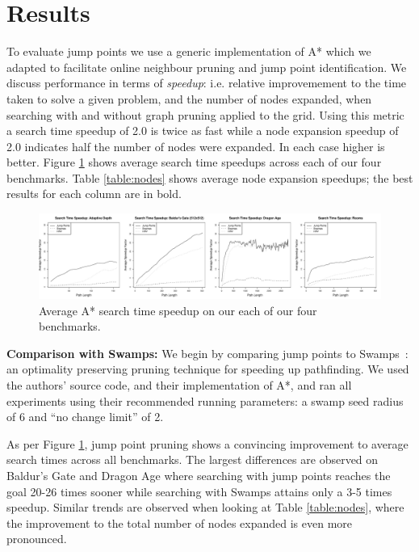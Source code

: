 \section{Results}
To evaluate jump points we use a generic implementation of A* which we 
adapted to facilitate online neighbour pruning and jump point identification.
We discuss
performance in terms of \emph{speedup}: i.e. relative improvemement to the time 
taken to solve a given problem, and the number of nodes expanded, when searching
with and without graph pruning applied to the grid.
Using this metric a search time speedup
of 2.0 is twice as fast while a node expansion speedup of 2.0 indicates half the
number of nodes were expanded.  In each case higher is better.
Figure \ref{fig:speedup} shows average search time speedups across
each of our four benchmarks. Table \ref{table:nodes} shows average
node expansion speedups; the best results for each column are in bold.



\begin{figure}[t]
   \begin{center}
	   \includegraphics[width=2.0\columnwidth, trim = 10mm 10mm 10mm 0mm]
		{diagrams/speedup.pdf}
   \end{center}
   \caption{Average A* search time speedup on our each of our four benchmarks. }

\label{fig:speedup}
\end{figure}

\textbf{Comparison with Swamps: }
We begin by comparing jump points to Swamps~\cite{pochter10}: an optimality
preserving pruning technique for speeding up pathfinding.  
We used the authors' source code, and their implementation of A*, and ran
all experiments using their recommended running parameters: a swamp seed radius
of 6 and ``no change limit'' of 2.

As per Figure \ref{fig:speedup}, jump point pruning shows a convincing
improvement to average search times across all benchmarks.
The largest differences are
observed on Baldur's Gate and Dragon Age where searching with jump points
reaches the goal 20-26 times sooner while searching with Swamps attains only a 3-5
times speedup.  Similar trends are observed when looking at Table
\ref{table:nodes}, where the improvement to the total number of nodes expanded
is even more pronounced.

